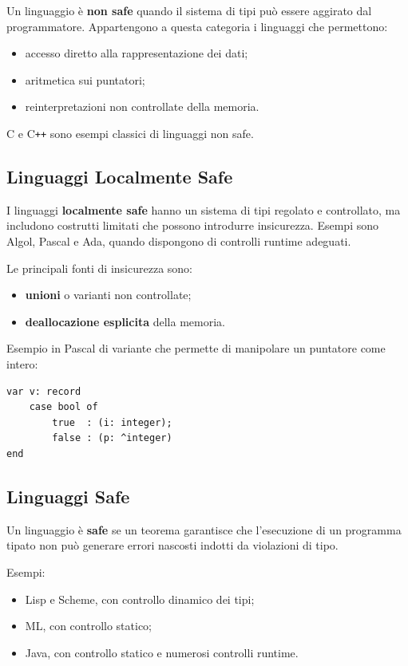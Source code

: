 \documentclass{article}
\begin{document}
Un linguaggio è \textbf{non safe} quando il sistema di tipi può essere aggirato dal programmatore. Appartengono a questa categoria i linguaggi che permettono:
\begin{itemize}
  \item accesso diretto alla rappresentazione dei dati;
  \item aritmetica sui puntatori;
  \item reinterpretazioni non controllate della memoria.
\end{itemize}

C e C\texttt{++} sono esempi classici di linguaggi non safe.

\subsection{Linguaggi Localmente Safe}

I linguaggi \textbf{localmente safe} hanno un sistema di tipi regolato e controllato, ma includono costrutti limitati che possono introdurre insicurezza. Esempi sono Algol, Pascal e Ada, quando dispongono di controlli runtime adeguati.

Le principali fonti di insicurezza sono:
\begin{itemize}
  \item \textbf{unioni} o varianti non controllate;
  \item \textbf{deallocazione esplicita} della memoria.
\end{itemize}

Esempio in Pascal di variante che permette di manipolare un puntatore come intero:

\begin{lstlisting}
var v: record
    case bool of
        true  : (i: integer);
        false : (p: ^integer)
end
\end{lstlisting}

\subsection{Linguaggi Safe}

Un linguaggio è \textbf{safe} se un teorema garantisce che l'esecuzione di un programma tipato non può generare errori nascosti indotti da violazioni di tipo.

Esempi:
\begin{itemize}
  \item Lisp e Scheme, con controllo dinamico dei tipi;
  \item ML, con controllo statico;
  \item Java, con controllo statico e numerosi controlli runtime.
\end{itemize}
\end{document}

